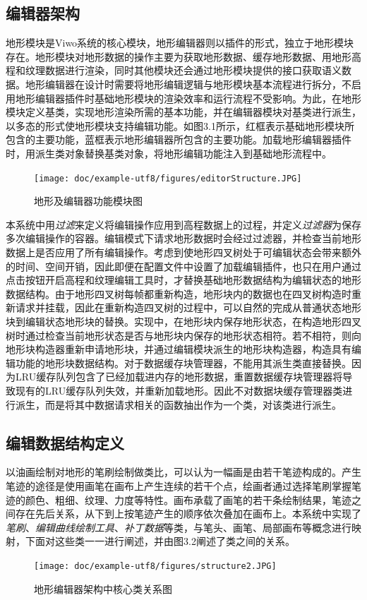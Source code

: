 \subsection{编辑器架构}
地形模块是Viwo系统的核心模块，地形编辑器则以插件的形式，独立于地形模块存在。地形模块对地形数据的操作主要为获取地形数据、缓存地形数据、用地形高程和纹理数据进行渲染，同时其他模块还会通过地形模块提供的接口获取语义数据。地形编辑器在设计时需要将地形编辑逻辑与地形模块基本流程进行拆分，不启用地形编辑器插件时基础地形模块的渲染效率和运行流程不受影响。为此，在地形模块定义基类，实现地形渲染所需的基本功能，并在编辑器模块对基类进行派生，以多态的形式使地形模块支持编辑功能。如图3.1所示，红框表示基础地形模块所包含的主要功能，蓝框表示地形编辑器所包含的主要功能。加载地形编辑器插件时，用派生类对象替换基类对象，将地形编辑功能注入到基础地形流程中。\par

\begin{figure}[htbp]
\centering
\texttt{[image: doc/example-utf8/figures/editorStructure.JPG]}
\caption{地形及编辑器功能模块图}
\end{figure}
本系统中用\textit{过滤}\supercite{summer}来定义将编辑操作应用到高程数据上的过程，并定义\textit{过滤器}为保存多次编辑操作的容器。编辑模式下请求地形数据时会经过过滤器，并检查当前地形数据上是否应用了所有编辑操作。考虑到使地形四叉树处于可编辑状态会带来额外的时间、空间开销，因此即便在配置文件中设置了加载编辑插件，也只在用户通过点击按钮开启高程和纹理编辑工具时，才替换基础地形数据结构为编辑状态的地形数据结构。由于地形四叉树每帧都重新构造，地形块内的数据也在四叉树构造时重新请求并挂载，因此在重新构造四叉树的过程中，可以自然的完成从普通状态地形块到编辑状态地形块的替换。实现中，在地形块内保存地形状态，在构造地形四叉树时通过检查当前地形状态是否与地形块内保存的地形状态相符。若不相符，则向地形块构造器重新申请地形块，并通过编辑模块派生的地形块构造器，构造具有编辑功能的地形块数据结构。对于数据缓存块管理器，不能用其派生类直接替换。因为LRU缓存队列包含了已经加载进内存的地形数据，重置数据缓存块管理器将导致现有的LRU缓存队列失效，并重新加载地形。因此不对数据块缓存管理器类进行派生，而是将其中数据请求相关的函数抽出作为一个类，对该类进行派生。
\subsection{编辑数据结构定义}
以油画绘制对地形的笔刷绘制做类比，可以认为一幅画是由若干笔迹构成的。产生笔迹的途径是使用画笔在画布上产生连续的若干个点，绘画者通过选择笔刷掌握笔迹的颜色、粗细、纹理、力度等特性。画布承载了画笔的若干条绘制结果，笔迹之间存在先后关系，从下到上按笔迹产生的顺序依次叠加在画布上。本系统中实现了\textit{笔刷}、\textit{编辑曲线绘制工具}、\textit{补丁数据}等类，与笔头、画笔、局部画布等概念进行映射，下面对这些类一一进行阐述，并由图3.2阐述了类之间的关系。\par
\begin{figure}[htb]
\centering
\texttt{[image: doc/example-utf8/figures/structure2.JPG]}
\caption{地形编辑器架构中核心类关系图}
\end{figure}
